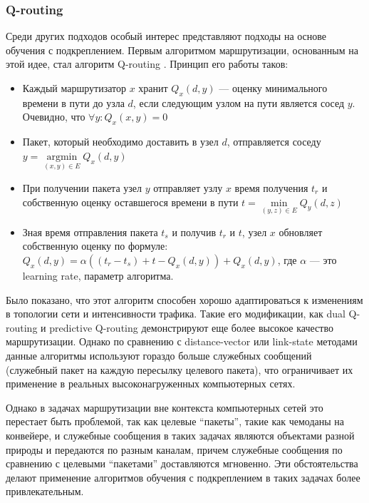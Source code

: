 \documentclass[specification,annotation,times]{itmo-student-thesis}
\DeclareMathOperator{\argmin}{argmin}
\theoremstyle{definition}
\begin{document}
\subsubsection{Q-routing}\label{q-routing-desc}

Среди других подходов особый интерес представляют подходы на основе обучения с
подкреплением. Первым алгоритмом маршрутизации, основанным на этой идее, стал
алгоритм Q-routing \cite{q-routing-orig}. Принцип его работы таков:

\begin{itemize}
\item Каждый маршрутизатор $x$ хранит $Q_x(d, y)$ --- оценку минимального
  времени в пути до узла $d$, если следующим узлом на пути является сосед $y$.
  Очевидно, что $\forall y : Q_x(x, y) = 0$ 
\item Пакет, который необходимо доставить в узел $d$, отправляется соседу
  $y = \argmin\limits_{(x, y) \in E} Q_x(d, y)$
\item При получении пакета узел $y$ отправляет узлу $x$ время получения $t_r$ и
  собственную оценку оставшегося времени в пути
  $t = \min\limits_{(y, z) \in E} Q_y(d, z)$
\item Зная время отправления пакета $t_s$ и получив $t_r$ и $t$, узел $x$
  обновляет собственную оценку по формуле:
  $Q_x(d, y) = \alpha((t_r - t_s) + t - Q_x(d, y)) + Q_x(d, y)$,
  где $\alpha$ --- это learning rate, параметр алгоритма.
\end{itemize}

Было показано, что этот алгоритм способен хорошо адаптироваться к изменениям в
топологии сети и интенсивности трафика. Такие его модификации, как dual
Q-routing \cite{dual-q-routing} и predictive Q-routing \cite{predictive-q-routing}
демонстрируют еще более высокое качество маршрутизации. Однако по сравнению с
distance-vector или link-state методами данные алгоритмы используют гораздо
больше служебных сообщений (служебный пакет на каждую пересылку целевого
пакета), что ограничивает их применение в реальных высоконагруженных
компьютерных сетях.

Однако в задачах маршрутизации вне контекста компьютерных сетей это перестает
быть проблемой, так как целевые \enquote{пакеты}, такие как чемоданы на конвейере,
и служебные сообщения в таких задачах являются объектами разной природы и
передаются по разным каналам, причем служебные сообщения по сравнению с целевыми
\enquote{пакетами} доставляются мгновенно. Эти обстоятельства делают применение
алгоритмов обучения с подкреплением в таких задачах более привлекательным.
\end{document}

